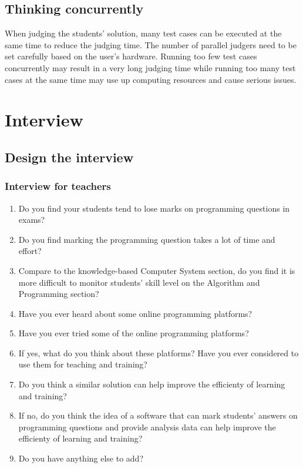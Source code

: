 \documentclass[a4paper]{report}
\begin{document}
\subsection{Thinking concurrently}

When judging the students' solution, many test cases can be executed at the same time to reduce the judging time. The number of parallel judgers need to be set carefully based on the user's hardware. Running too few test cases concurrently may result in a very long judging time while running too many test cases at the same time may use up computing resources and cause serious issues.

\section{Interview}

\subsection{Design the interview}

\subsubsection{Interview for teachers}

\begin{enumerate}
    \item Do you find your students tend to lose marks on programming questions in exams?
    \item Do you find marking the programming question takes a lot of time and effort?
    \item Compare to the knowledge-based Computer System section, do you find it is more difficult to monitor students' skill level on the Algorithm and Programming section?
    \item Have you ever heard about some online programming platforms?
    \item Have you ever tried some of the online programming platforms?
    \item If yes, what do you think about these platforms? Have you ever considered to use them for teaching and training?
    \item Do you think a similar solution can help improve the efficienty of learning and training?
    \item If no, do you think the idea of a software that can mark students' answers on programming questions and provide analysis data can help improve the efficienty of learning and training?
    \item Do you have anything else to add?
\end{enumerate}
\end{document}
